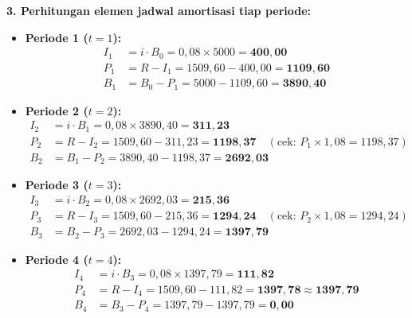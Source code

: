\documentclass[11pt,a4paper]{article}
\begin{document}
\textbf{3. Perhitungan elemen jadwal amortisasi tiap periode:}
\begin{itemize}[leftmargin=1.5em, topsep=0pt, itemsep=2pt]
    \item \textbf{Periode 1 ($t = 1$):}
    \begin{align*}
        I_1 &= i \cdot B_0 = 0{,}08 \times 5000 = \mathbf{400{,}00} \\
        P_1 &= R - I_1 = 1509{,}60 - 400{,}00 = \mathbf{1109{,}60} \\
        B_1 &= B_0 - P_1 = 5000 - 1109{,}60 = \mathbf{3890{,}40}
    \end{align*}
    \item \textbf{Periode 2 ($t = 2$):}
    \begin{align*}
        I_2 &= i \cdot B_1 = 0{,}08 \times 3890{,}40 = \mathbf{311{,}23} \\
        P_2 &= R - I_2 = 1509{,}60 - 311{,}23 = \mathbf{1198{,}37} \quad (\text{cek: } P_1 \times 1{,}08 = 1198{,}37) \\
        B_2 &= B_1 - P_2 = 3890{,}40 - 1198{,}37 = \mathbf{2692{,}03}
    \end{align*}
    \item \textbf{Periode 3 ($t = 3$):}
    \begin{align*}
        I_3 &= i \cdot B_2 = 0{,}08 \times 2692{,}03 = \mathbf{215{,}36} \\
        P_3 &= R - I_3 = 1509{,}60 - 215{,}36 = \mathbf{1294{,}24} \quad (\text{cek: } P_2 \times 1{,}08 = 1294{,}24) \\
        B_3 &= B_2 - P_3 = 2692{,}03 - 1294{,}24 = \mathbf{1397{,}79}
    \end{align*}
    \item \textbf{Periode 4 ($t = 4$):}
    \begin{align*}
        I_4 &= i \cdot B_3 = 0{,}08 \times 1397{,}79 = \mathbf{111{,}82} \\
        P_4 &= R - I_4 = 1509{,}60 - 111{,}82 = \mathbf{1397{,}78 \approx 1397{,}79} \\
        B_4 &= B_3 - P_4 = 1397{,}79 - 1397{,}79 = \mathbf{0{,}00}
    \end{align*}
\end{itemize}
\end{document}
